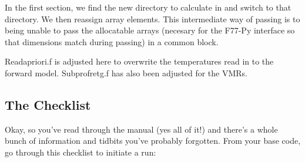 \documentclass[11pt, a4paper,titlepage]{report}
\begin{document}


In the first section, we find the new directory to calculate in and switch to that directory. We then reassign array elements. This intermediate way of passing is to being unable to pass the allocatable arrays (necesary for the F77-Py interface so that dimensions match during passing) in a common block. 



Readapriori.f is adjusted here to overwrite the temperatures read in to the forward model. Subprofretg.f has also been adjusted for the VMRs.

\subsection{The Checklist}

Okay, so you've read through the manual (yes all of it!) and there's a whole bunch of information and tidbits you've probably forgotten. From your base code, go through this checklist to initiate a run:
\end{document}
